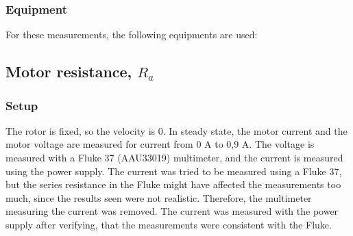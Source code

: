 \subsubsection{Equipment}
For these measurements, the following equipments are used:
\begin{table}[H]
\centering
{}
\caption{Equipment used to determine motor parameters.}
\label{motor_equipment}
\end{table}


\subsection{Motor resistance, $R_a$}
\subsubsection{Setup}
The rotor is fixed, so the velocity is 0. In steady state, the motor
current and the motor voltage are measured for current from 0 A to 0,9 A.
The voltage is measured with a Fluke 37 (AAU33019) multimeter, and the current is measured using the power supply. The current was tried to be measured using a Fluke 37, but the series resistance in the Fluke might have affected the measurements too much, since the results seen were not realistic. Therefore, the multimeter measuring the current was removed. The current was measured with the power supply after verifying, that the measurements were consistent with the Fluke.

